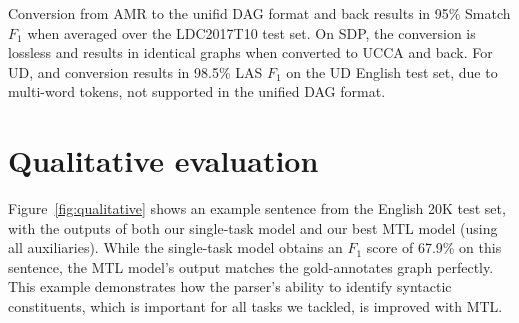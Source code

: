 Conversion from AMR to the unifid DAG format and back
results in 95\% Smatch $F_1$ \cite{cai2013smatch} when averaged over the
LDC2017T10 test set.
On SDP, the conversion is lossless and results in identical graphs
when converted to UCCA and back.
For UD, and conversion results in 98.5\% LAS $F_1$ on the UD English test set,
due to multi-word tokens, not supported in the unified DAG format.

\section{Qualitative evaluation}

Figure~\ref{fig:qualitative} shows an example sentence from the English 20K test set,
with the outputs of both our single-task model and our best MTL model (using all auxiliaries).
While the single-task model obtains an $F_1$ score of 67.9\% on this sentence, the MTL model's output
matches the gold-annotates graph perfectly.
This example demonstrates how
the parser's ability to identify syntactic constituents,
which is important for all tasks we tackled, is improved with MTL.


